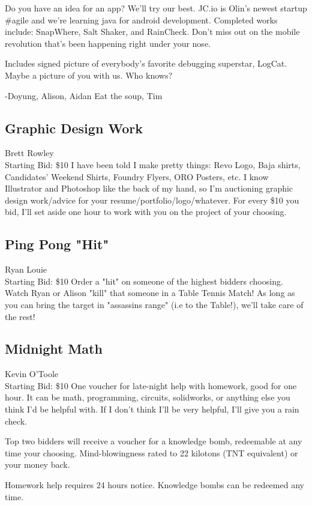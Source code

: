 \documentclass[11pt]{article}
\begin{document}
Do you have an idea for an app?  We'll try our best.
JC.io is Olin's newest startup \#agile and we're learning java for android development.  Completed works include: SnapWhere, Salt Shaker, and RainCheck.  Don't miss out on the mobile revolution that's been happening right under your nose.

Includes signed picture of everybody's favorite debugging superstar, LogCat.  Maybe a picture of you with us. Who knows?

-Doyung, Alison, Aidan
Eat the soup, Tim
\subsection{Graphic Design Work}
Brett Rowley
\\
Starting Bid: \$10
\newline
I have been told I make pretty things: Revo Logo, Baja shirts, Candidates' Weekend Shirts, Foundry Flyers, ORO Posters, etc. I know Illustrator and Photoshop like the back of my hand, so I'm auctioning graphic design work/advice for your resume/portfolio/logo/whatever. For every \$10 you bid, I'll set aside one hour to work with you on the project of your choosing.
\subsection{Ping Pong "Hit"}
Ryan Louie
\\
Starting Bid: \$10
\newline
Order a "hit" on someone of the highest bidders choosing.  Watch Ryan or Alison "kill" that someone in a Table Tennis Match!  As long as you can bring the target in "assassins range" (i.e to the Table!), we'll take care of the rest!
\subsection{Midnight Math}
Kevin O'Toole
\\
Starting Bid: \$10
\newline
One voucher for late-night help with homework, good for one hour. It can be math, programming, circuits, solidworks, or anything else you think I'd be helpful with. If I don't think I'll be very helpful, I'll give you a rain check.

Top two bidders will receive a voucher for a knowledge bomb, redeemable at any time your choosing. Mind-blowingness rated to 22 kilotons (TNT equivalent) or your money back.

Homework help requires 24 hours notice. Knowledge bombs can be redeemed any time.
\end{document}
